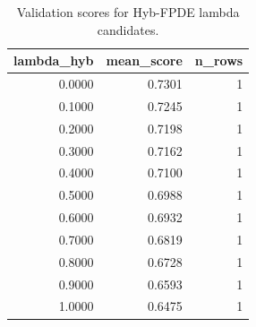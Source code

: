 \begin{table}[t]
\caption{Validation scores for Hyb-FPDE lambda candidates.}
\label{tab:lambda_distribution_computed}
\centering
\begin{tabular}{rrr}
\toprule
lambda\_hyb & mean\_score & n\_rows \\
\midrule
0.0000 & 0.7301 & 1 \\
0.1000 & 0.7245 & 1 \\
0.2000 & 0.7198 & 1 \\
0.3000 & 0.7162 & 1 \\
0.4000 & 0.7100 & 1 \\
0.5000 & 0.6988 & 1 \\
0.6000 & 0.6932 & 1 \\
0.7000 & 0.6819 & 1 \\
0.8000 & 0.6728 & 1 \\
0.9000 & 0.6593 & 1 \\
1.0000 & 0.6475 & 1 \\
\bottomrule
\end{tabular}

\end{table}
